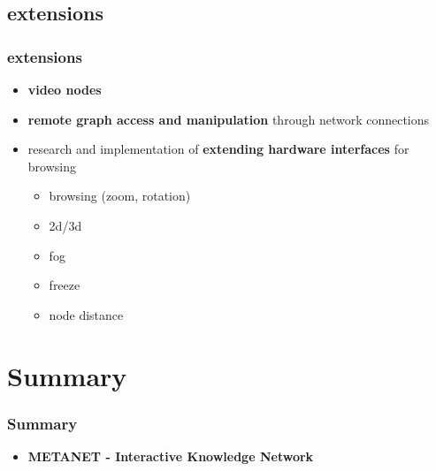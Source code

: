 \documentclass[blue]{beamer}
\begin{document}
\subsection{extensions}
\frame
{
\frametitle{\textbf{extensions}}
\begin{itemize}
	\item \textbf{video nodes}
	\item \textbf{remote graph access and manipulation} through network connections
	\item research and implementation of \textbf{extending hardware interfaces} for browsing
		\begin{itemize}[<+-|alert@+>]
			\item browsing (zoom, rotation)
			\item 2d/3d
			\item fog
			\item freeze
			\item node distance
		\end{itemize}
\end{itemize}
}

















\section*{Summary}
\frame
{
\frametitle{\textbf{Summary}}
\begin{itemize}
\item \textbf{METANET - Interactive Knowledge Network}
\end{itemize}
}


\end{document}
